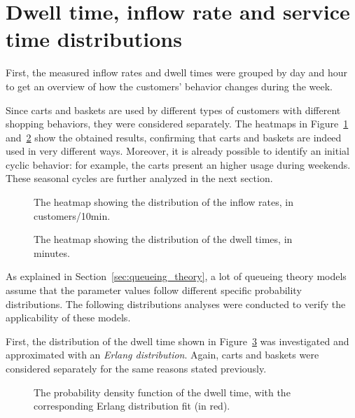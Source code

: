 \section{Dwell time, inflow rate and service time distributions}
\label{sec:dwell_time_inflow_rate_service_time_distributions}

First, the measured inflow rates and dwell times were grouped by day and hour to get an overview of how the customers’ behavior changes during the week.

Since carts and baskets are used by different types of customers with different shopping behaviors, they were considered separately. The heatmaps in Figure~\ref{fig:inflow_rate_heatmap} and~\ref{fig:dwell_time_heatmap} show the obtained results, confirming that carts and baskets are indeed used in very different ways. Moreover, it is already possible to identify an initial cyclic behavior: for example, the carts present an higher usage during weekends. These seasonal cycles are further analyzed in the next section.

\begin{figure}
  \begin{center}
  \end{center}
  \caption{The heatmap showing the distribution of the inflow rates, in customers/10min.}
  \label{fig:inflow_rate_heatmap}
\end{figure}

\begin{figure}
  \begin{center}
  \end{center}
  \caption{The heatmap showing the distribution of the dwell times, in minutes.}
  \label{fig:dwell_time_heatmap}
\end{figure}

As explained in Section~\ref{sec:queueing_theory}, a lot of queueing theory models assume that the parameter values follow different specific probability distributions. The following distributions analyses were conducted to verify the applicability of these models.

First, the distribution of the dwell time shown in Figure~\ref{fig:dwell_time_distribution} was investigated and approximated with an \emph{Erlang distribution}. Again, carts and baskets were considered separately for the same reasons stated previously.

\begin{figure}
  \begin{center}
  \end{center}
  \caption{The probability density function of the dwell time, with the corresponding Erlang distribution fit (in red).}
  \label{fig:dwell_time_distribution}
\end{figure}

